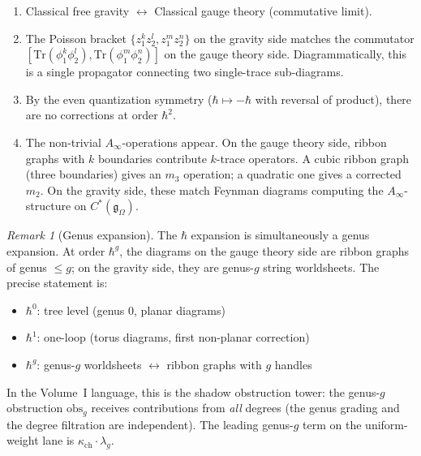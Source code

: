 \documentclass[11pt]{article}
\theoremstyle{definition}
\theoremstyle{remark}
\newtheorem{remark}[theorem]{Remark}
\newcommand{\Tr}{\mathrm{Tr}}
\newcommand{\frakg}{\mathfrak{g}}
\begin{document}
\begin{enumerate}[label=\textbf{Order $\hbar^{\arabic*}$:}]
 \item[{$\hbar^0$:}]
 Classical free gravity $\longleftrightarrow$ Classical gauge theory
 (commutative limit).

 \item[{$\hbar^1$:}]
 The Poisson bracket $\{z_1^k z_2^l, z_1^m z_2^n\}$ on the gravity side
 matches the commutator $[\Tr(\phi_1^k \phi_2^l), \Tr(\phi_1^m \phi_2^n)]$
 on the gauge theory side. Diagrammatically, this is a single propagator
 connecting two single-trace sub-diagrams.

 \item[{$\hbar^2$:}]
 By the even quantization symmetry ($\hbar \mapsto -\hbar$ with reversal of
 product), there are no corrections at order $\hbar^2$.

 \item[{$\hbar^3$:}]
 The non-trivial $A_\infty$-operations appear. On the gauge theory side,
 ribbon graphs with $k$ boundaries contribute $k$-trace operators. A cubic
 ribbon graph (three boundaries) gives an $m_3$ operation; a quadratic one
 gives a corrected $m_2$. On the gravity side, these match Feynman diagrams
 computing the $A_\infty$-structure on $C^*(\frakg_\Omega)$.
\end{enumerate}

\begin{remark}[Genus expansion]
The $\hbar$ expansion is simultaneously a genus expansion. At order $\hbar^g$,
the diagrams on the gauge theory side are ribbon graphs of genus $\leq g$; on
the gravity side, they are genus-$g$ string worldsheets. The precise statement
is:
\begin{itemize}
 \item $\hbar^0$: tree level (genus 0, planar diagrams)
 \item $\hbar^1$: one-loop (torus diagrams, first non-planar correction)
 \item $\hbar^g$: genus-$g$ worldsheets $\longleftrightarrow$ ribbon graphs
 with $g$ handles
\end{itemize}
In the Volume~I language, this is the shadow obstruction tower: the genus-$g$
obstruction $\mathrm{obs}_g$ receives contributions from \emph{all} degrees
(the genus grading and the degree filtration are independent). The leading
genus-$g$ term on the uniform-weight lane is $\kappa_{\mathrm{ch}} \cdot \lambda_g$.
\end{remark}


\end{document}
